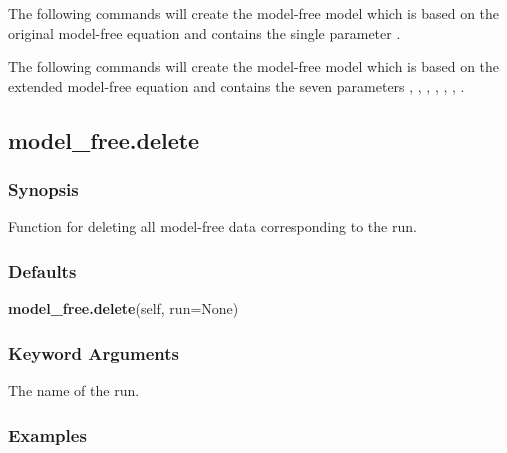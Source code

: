 The following commands will create the model-free model 
 which is based on the original
model-free equation and contains the single parameter 
.





The following commands will create the model-free model 
 which is based on the
extended model-free equation and contains the seven parameters 
, 
, 
, 
,
, 
, 
.





\newpage

\subsection{model\_free.delete}


\subsubsection{Synopsis}

Function for deleting all model-free data corresponding to the run.

\subsubsection{Defaults}

\textsf{\textbf{model\_free.delete}(self, run=None)}


\subsubsection{Keyword Arguments}


  The name of the run.

\subsubsection{Examples}

